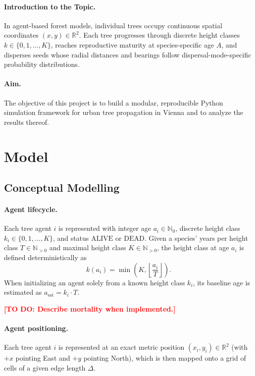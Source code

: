 \documentclass[a4paper,11pt]{scrartcl}
\newcommand{\N}{\mathbb{N}}
\newcommand{\R}{\mathbb{R}}
\DeclareRobustCommand{\todo}[1]{\textcolor{red}{\textbf{[TO DO: #1]}}}
\begin{document}
\paragraph{Introduction to the Topic.}
In agent-based forest models, individual trees occupy continuous spatial coordinates $(x, y) \in \R^2$. Each tree progresses through discrete height classes $k \in \{0, 1, \dots, K\}$, reaches reproductive maturity at species-specific age $A$, and disperses seeds whose radial distances and bearings follow dispersal-mode-specific probability distributions.

\paragraph{Aim.}
The objective of this project is to build a modular, reproducible Python simulation framework for urban tree propagation in Vienna and to analyze the results thereof.

\section{Model}
\subsection{Conceptual Modelling}
\label{sec:modelling}
\paragraph{Agent lifecycle.}
Each tree agent $i$ is represented with integer age $a_i \in \N_0$, discrete height class $k_i \in \{0, 1, \dots, K\}$, and status $\text{ALIVE}$ or $\text{DEAD}$. Given a species' years per height class $T \in \N_{>0}$ and maximal height class $K \in \N_{>0}$, the height class at age $a_i$ is defined deterministically as
\begin{equation}
\label{eq:height_class}
k(a_i) = \min\!\left(K, \left\lfloor \frac{a_i}{T} \right\rfloor \right).
\end{equation}
When initializing an agent solely from a known height class $k_i$, its baseline age is estimated as $a_{\text{est}} = k_i \cdot T$.

\todo{Describe mortality when implemented.}

\paragraph{Agent positioning.}
Each tree agent $i$ is represented at an exact metric position $(x_i, y_i) \in \R^2$ (with $+x$ pointing East and $+y$ pointing North), which is then mapped onto a grid of cells of a given edge length $\Delta$.
\end{document}
